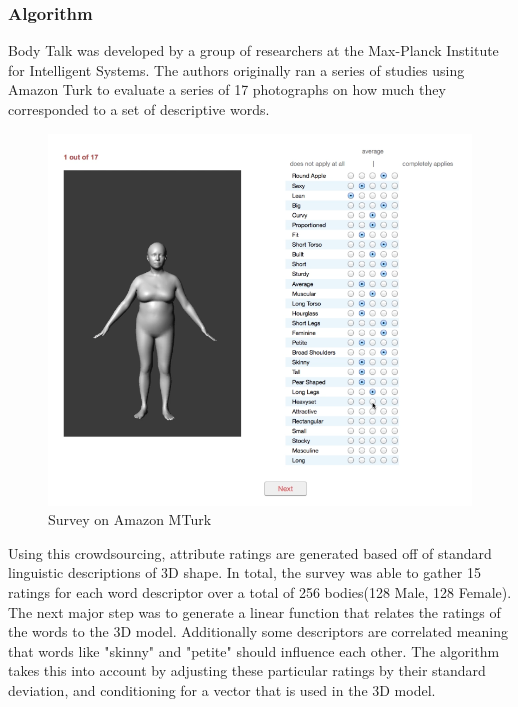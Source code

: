 \documentclass[journal]{vgtc}                %
\begin{document}
\subsubsection{Algorithm}
\noindent Body Talk was developed by a group of researchers at the Max-Planck Institute for Intelligent Systems. The authors originally ran a series
of studies using Amazon Turk to evaluate a series of 17 photographs on how much they corresponded to a set of descriptive words. \
\begin{figure}[!htb]
	\includegraphics[width=\columnwidth]{survey}
	\caption{Survey on Amazon MTurk}
\end{figure}
Using this crowdsourcing, attribute ratings are generated based off of standard linguistic descriptions of 3D shape. In total, the
survey was able to gather 15 ratings for each word descriptor over a total of 256 bodies(128 Male, 128 Female). The next major step was
to generate a linear function that relates the ratings of the words to the 3D model. Additionally some descriptors are correlated
meaning that words like "skinny" and "petite" should influence each other. The algorithm takes this into account by adjusting these
particular ratings by their standard deviation, and conditioning for a vector that is used in the 3D model.
\end{document}
